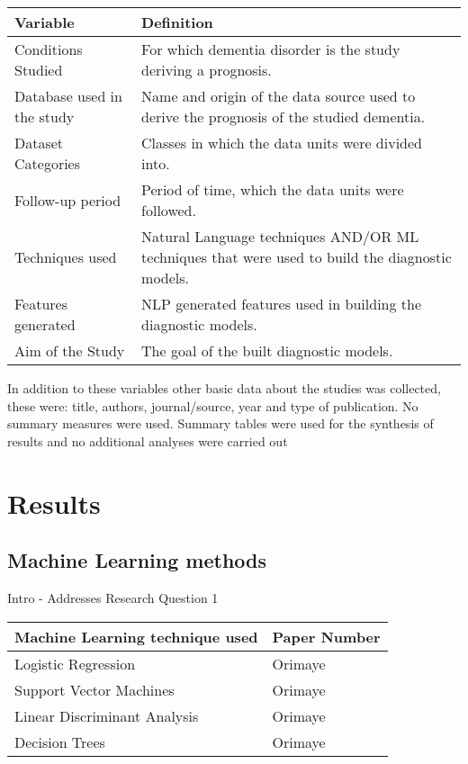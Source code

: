 \documentclass[12pt]{article}
\begin{document}
\begin{table}[H]
	\begin{center}
	\begin{tabular}{ p{6cm} | p{6cm} }
	\hline
	Variable & Definition \\ \hline
	Conditions Studied & For which dementia disorder is the study deriving a prognosis. \\ \hline
	Database used in the study & Name and origin of the data source used to derive the prognosis of the studied dementia. \\ \hline
	Dataset Categories & Classes in which the data units were divided into. \\ \hline
	Follow-up period & Period of time, which the data units were followed. \\ \hline
	Techniques used & Natural Language techniques AND/OR ML techniques that were used to build the diagnostic models. \\ \hline 
	Features generated & NLP generated features used in building the diagnostic models. \\ \hline
	Aim of the Study & The goal of the built diagnostic models. \\
	\hline 
	\end{tabular}
	\end{center}
\end{table}

In addition to these variables other basic data about the studies was collected, these were: title, authors, journal/source, year and type of publication. No summary measures were used. Summary tables were used for the synthesis of results and no additional analyses were carried out

\section{Results}\label{results}
\subsection{Machine Learning methods}
Intro - Addresses Research Question 1

\begin{table}[H]
	\begin{center}
	\begin{tabular}{ p{6cm} | p{6cm} }
	\hline
	Machine Learning technique used & Paper Number \\ \hline
	Logistic Regression & Orimaye \\ \hline
	Support Vector Machines & Orimaye \\ \hline
	Linear Discriminant Analysis & Orimaye \\ \hline
	Decision Trees & Orimaye \\ \hline	
	\hline 
	\end{tabular}
	\end{center}
\end{table}
\end{document}
